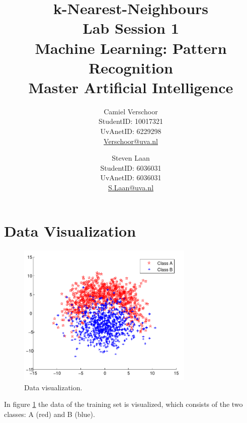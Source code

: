 \documentclass[a4paper]{article}
\title{k-Nearest-Neighbours\\\large Lab Session 1\\Machine Learning: Pattern Recognition\\Master Artificial Intelligence}
\author{Camiel Verschoor \\StudentID: 10017321\\UvAnetID: 6229298\\ \url{Verschoor@uva.nl} \and Steven Laan\\StudentID: 6036031\\UvAnetID: 6036031\\\url{S.Laan@uva.nl}}
\begin{document}
\maketitle

\section{Data Visualization}
\begin{figure}[!ht]
\centering
\includegraphics[width=0.75\textwidth]{images/data_scatterplot.pdf}
\caption{Data visualization.}
\label{data}
\end{figure}
In figure \ref{data} the data of the training set is visualized, which consists of the two classes: A (red) and B (blue).

\newpage
\end{document}
